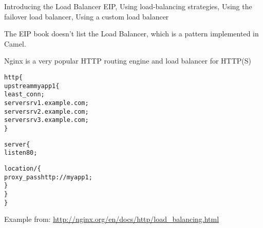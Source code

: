 \documentclass[Screen16to9,17pt]{foils}
\begin{document}


\begin{list2}
\item Introducing the Load Balancer EIP, Using load-­balancing
strategies, Using the failover load balancer, Using a
custom load balancer
\item The EIP book doesn’t list the Load Balancer, which is a pattern implemented in Camel.
\item Nginx is a very popular HTTP routing engine and load balancer for HTTP(S)
\end{list2}



\begin{alltt}\footnotesize
  http \{
      upstream myapp1 \{
          least_conn;
          server srv1.example.com;
          server srv2.example.com;
          server srv3.example.com;
      \}

      server \{
          listen 80;

          location / \{
              proxy_pass http://myapp1;
          \}
      \}
  \}
\end{alltt}

Example from:
\url{http://nginx.org/en/docs/http/load_balancing.html}

\slidenext
\end{document}
